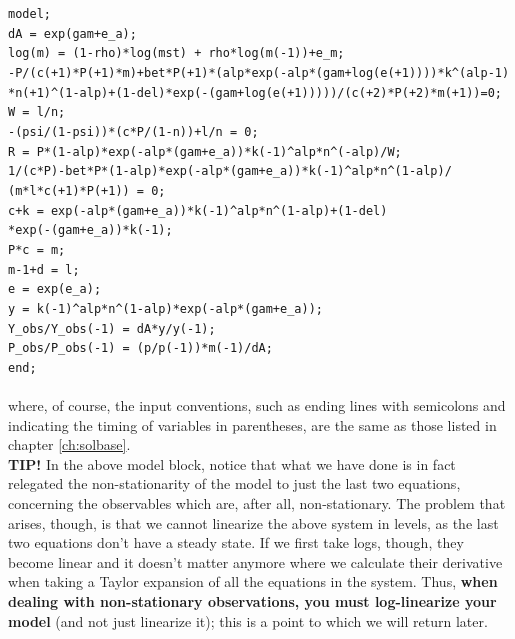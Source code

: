 \texttt{model;\\
dA = exp(gam+e\_a);\\
log(m) = (1-rho)*log(mst) + rho*log(m(-1))+e\_m;\\
-P/(c(+1)*P(+1)*m)+bet*P(+1)*(alp*exp(-alp*(gam+log(e(+1))))*k\textasciicircum (alp-1)\\
*n(+1)\textasciicircum (1-alp)+(1-del)*exp(-(gam+log(e(+1)))))/(c(+2)*P(+2)*m(+1))=0;\\
W = l/n;\\
-(psi/(1-psi))*(c*P/(1-n))+l/n = 0;\\
R = P*(1-alp)*exp(-alp*(gam+e\_a))*k(-1)\textasciicircum alp*n\textasciicircum (-alp)/W;\\
1/(c*P)-bet*P*(1-alp)*exp(-alp*(gam+e\_a))*k(-1)\textasciicircum alp*n\textasciicircum (1-alp)/\\
(m*l*c(+1)*P(+1)) = 0;\\
c+k = exp(-alp*(gam+e\_a))*k(-1)\textasciicircum alp*n\textasciicircum (1-alp)+(1-del)\\
*exp(-(gam+e\_a))*k(-1);\\
P*c = m;\\
m-1+d = l;\\
e = exp(e\_a);\\
y = k(-1)\textasciicircum alp*n\textasciicircum (1-alp)*exp(-alp*(gam+e\_a));\\
Y\_obs/Y\_obs(-1) = dA*y/y(-1);\\
P\_obs/P\_obs(-1) = (p/p(-1))*m(-1)/dA;\\
end;}\\
\\
where, of course, the input conventions, such as ending lines with semicolons and indicating the timing of variables in parentheses, are the same as those listed in chapter \ref{ch:solbase}. \\

\textsf{\textbf{TIP!}} In the above model block, notice that what we have done is in fact relegated the non-stationarity of the model to just the last two equations, concerning the observables which are, after all, non-stationary. The problem that arises, though, is that we cannot linearize the above system in levels, as the last two equations don't have a steady state. If we first take logs, though, they become linear and it doesn't matter anymore where we calculate their derivative when taking a Taylor expansion of all the equations in the system. Thus, \textbf{when dealing with non-stationary observations, you must log-linearize your model} (and not just linearize it); this is a point to which we will return later. 

